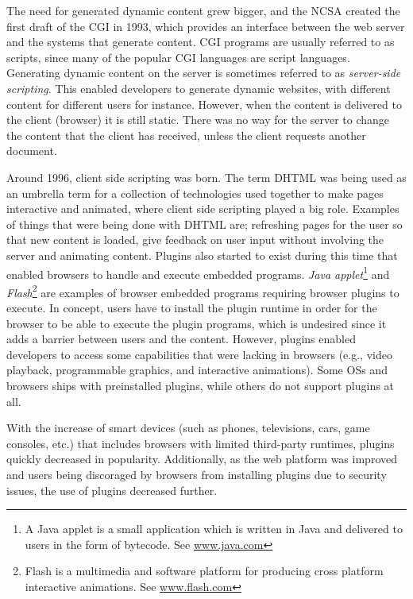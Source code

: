 \documentclass[a4paper,11pt]{kth-mag}
\begin{document}
        The need for generated dynamic content grew bigger, and the \gls{NCSA} created the first draft of the \gls{CGI} in 1993, which provides an interface between the \gls{web} server and the systems that generate content.
        \gls{CGI} programs are usually referred to as scripts, since many of the popular \gls{CGI} languages are script languages.
        Generating dynamic content on the server is sometimes referred to as \emph{server-side scripting}.
        This enabled developers to generate dynamic websites, with different content for different users for instance.
        However, when the content is delivered to the client (\gls{browser}) it is still static.
        There was no way for the server to change the content that the client has received, unless the client requests another \gls{document}.

        Around 1996, client side scripting was born.
        The term \gls{DHTML} was being used as an umbrella term for a collection of technologies used together to make pages interactive and animated, where client side scripting played a big role.
        Examples of things that were being done with \gls{DHTML} are; refreshing pages for the user so that new content is loaded, give feedback on user input without involving the server and animating content.
        Plugins also started to exist during this time that enabled \glspl{browser} to handle and execute embedded programs.
        \emph{Java applet}\footnote{A Java applet is a small application which is written in Java and delivered to users in the form of bytecode. See \url{www.java.com}} and \emph{Flash}\footnote{Flash is a multimedia and software platform for producing cross platform interactive animations. See \url{www.flash.com}} are examples of browser embedded programs requiring browser plugins to execute.
        In concept, users have to install the plugin runtime in order for the browser to be able to execute the plugin programs, which is undesired since it adds a barrier between users and the content.
        However, plugins enabled developers to access some capabilities that were lacking in browsers (e.g., video playback, programmable graphics, and interactive animations).
        Some \glspl{OS} and \glspl{browser} ships with preinstalled plugins, while others do not support plugins at all.

        With the increase of smart devices (such as phones, televisions, cars, game consoles, etc.) that includes \glspl{browser} with limited \gls{third-party} runtimes, plugins quickly decreased in popularity.
        Additionally, as the web platform was improved and users being discoraged by browsers from installing plugins due to security issues, the use of plugins decreased further.
\end{document}
